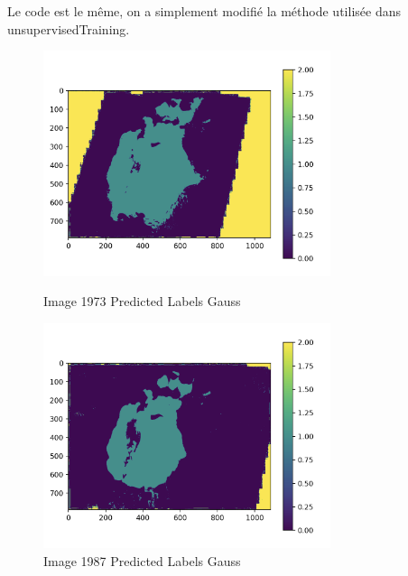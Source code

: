 Le code est le même, on a simplement modifié la méthode utilisée dans unsupervisedTraining.


\begin{figure}[!h]
    \begin{minipage}{.48\linewidth}
        \begin{center}
            \includegraphics[width=0.75\textwidth]{./img/7.2.3.png}
                \caption{\label{fig:6.4.1}Image 1973 Predicted Labels Gauss}  
            \end{center}
    \end{minipage}\hfill
    \begin{minipage}{.48\linewidth}
        \begin{center}
            \includegraphics[width=0.75\textwidth]{./img/7.2.4.png}
            \caption{\label{fig:6.4.2}Image 1987 Predicted Labels Gauss}  
        \end{center}
    \end{minipage}
\end{figure}





















